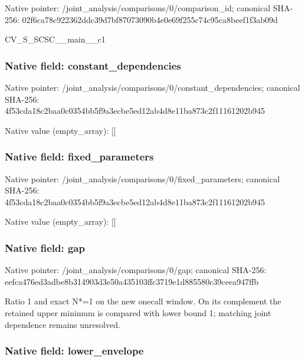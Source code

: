 \documentclass[10pt,a4paper]{article}
\begin{document}
Native pointer: /joint\_analysis/comparis\allowbreak{}ons/0/comparison\_id; canonical SHA-256: 02f6ca78c922362ddc39d7bf\allowbreak{}87073090b4e0e69f255c74c9\allowbreak{}5ca8beef1f3ab09d


CV\_S\_SCSC\_\_main\_\_c1


\subsubsection{Native field: constant\_dependencies}


Native pointer: /joint\_analysis/comparis\allowbreak{}ons/0/constant\_dependenc\allowbreak{}ies; canonical SHA-256: 4f53cda18c2baa0c0354bb5f\allowbreak{}9a3ecbe5ed12ab4d8e11ba87\allowbreak{}3c2f11161202b945



Native value (empty\_array): []



\subsubsection{Native field: fixed\_parameters}


Native pointer: /joint\_analysis/comparis\allowbreak{}ons/0/fixed\_parameters; canonical SHA-256: 4f53cda18c2baa0c0354bb5f\allowbreak{}9a3ecbe5ed12ab4d8e11ba87\allowbreak{}3c2f11161202b945



Native value (empty\_array): []



\subsubsection{Native field: gap}


Native pointer: /joint\_analysis/comparisons/0/gap; canonical SHA-256: eefca476ed3adbe8b314903d\allowbreak{}3e50a435103ffc3719e1d885\allowbreak{}580c39ceea947ffb


Ratio 1 and exact N*=1 on the new onecall window. On its complement the retained upper minimum is compared with lower bound 1; matching joint dependence remains unresolved.


\subsubsection{Native field: lower\_envelope}
\end{document}
